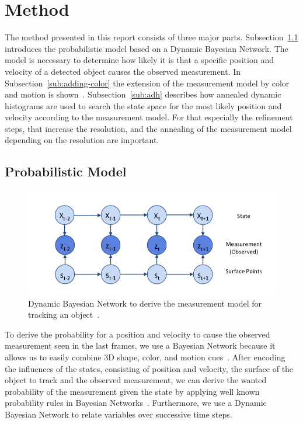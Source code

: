 \documentclass[twoside,a4paper,article]{combine}
\begin{document}
\section{Method}
\label{sec:method}
The method presented in this report consists of three major
parts. Subsection~\ref{sub:probabilistic-model} introduces the
probabilistic model based on a Dynamic Bayesian Network. The model is
necessary to determine how likely it is that a specific position and
velocity of a detected object causes the observed
measurement. In Subsection~\ref{sub:adding-color} the extension of the
measurement model by color and motion is shown~\cite{paper}.
Subsection~\ref{sub:adh} describes how annealed dynamic
histograms are used to search the state space for the most likely
position and velocity according to the measurement model. For that
especially the refinement steps, that increase the resolution, and the
annealing of the measurement model depending on the resolution are
important.

\subsection{Probabilistic Model}
\label{sub:probabilistic-model}

\begin{figure}
  \center
  \includegraphics[width=.8\linewidth]{dbn}
  \caption{Dynamic Bayesian Network to derive the measurement model
    for tracking an object~\cite{paper}.}
  \label{fig:dbn}
\end{figure}

To derive the probability for a position and velocity to cause the
observed measurement seen in the last frames, we use a Bayesian
Network because it allows us to easily combine 3D shape, color, and
motion cues~\cite{paper}. After encoding the influences of the states,
consisting of position and velocity, the surface of the object to
track and the observed measurement, we can derive the wanted
probability of the measurement given the state by applying well known
probability rules in Bayesian Networks~\cite{ai-modern}. Furthermore,
we use a Dynamic Bayesian Network to relate variables over successive
time steps.
\end{document}
